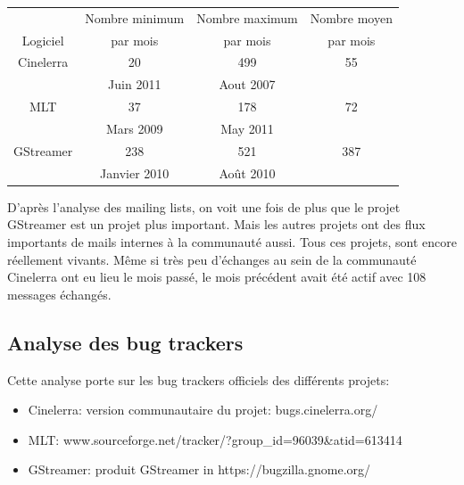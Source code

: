 \begin{center}

  \begin{tabular}{ | c | c | c | c|}

    \hline

         & Nombre minimum & Nombre maximum & Nombre moyen \\

Logiciel & par mois       & par mois   & par mois \\

\hline \hline

Cinelerra & 20 & 499 & 55 \\

          &  Juin 2011 & Aout 2007 & \\

\hline

MLT\index{MLT} & 37 & 178 & 72 \\

     & Mars 2009 & May 2011 & \\

\hline

GStreamer & 238 & 521 &  387\\

          & Janvier 2010 & Août 2010 & \\

\hline

  \end{tabular}

\end{center}

D'après l'analyse des mailing lists, on voit une fois de plus que le
projet GStreamer est un projet plus important. Mais les autres projets
ont des flux importants de mails internes à la communauté aussi. Tous ces
projets, sont encore réellement vivants. Même si très peu d'échanges
au sein de la communauté Cinelerra ont eu lieu le mois passé, le mois
précédent avait été actif avec 108 messages échangés.

\subsection {Analyse des bug trackers}

Cette analyse porte sur les bug trackers officiels des différents
projets:

\begin{itemize}

  \item {Cinelerra: version communautaire du projet:
    bugs.cinelerra.org/}

  \item {MLT:
  www.sourceforge.net/tracker/?group\_id=96039\&atid=613414}

  \item {GStreamer: produit GStreamer in https://bugzilla.gnome.org/}

\end{itemize}


